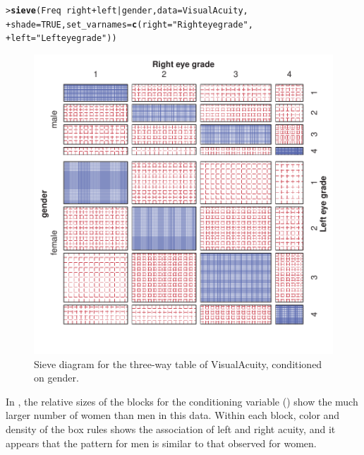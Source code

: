 \documentclass[10pt,krantz2]{krantz}\usepackage[]{graphicx}\usepackage[]{color}
\makeatletter
\newcommand{\hlnum}[1]{\textcolor[rgb]{0.686,0.059,0.569}{#1}}%
\newcommand{\hlstr}[1]{\textcolor[rgb]{0.192,0.494,0.8}{#1}}%
\newcommand{\hlopt}[1]{\textcolor[rgb]{0,0,0}{#1}}%
\newcommand{\hlstd}[1]{\textcolor[rgb]{0.345,0.345,0.345}{#1}}%
\newcommand{\hlkwc}[1]{\textcolor[rgb]{0.333,0.667,0.333}{#1}}%
\newcommand{\hlkwd}[1]{\textcolor[rgb]{0.737,0.353,0.396}{\textbf{#1}}}%
\newenvironment{kframe}{%
 \def\at@end@of@kframe{}%
 \ifinner\ifhmode%
  \def\at@end@of@kframe{\end{minipage}}%
  \begin{minipage}{\columnwidth}%
 \fi\fi%
 \def\FrameCommand##1{\hskip\@totalleftmargin \hskip-\fboxsep
 \colorbox{shadecolor}{##1}\hskip-\fboxsep
     \hskip-\linewidth \hskip-\@totalleftmargin \hskip\columnwidth}%
 \MakeFramed {\advance\hsize-\width
   \@totalleftmargin\z@ \linewidth\hsize
   \@setminipage}}%
 {\par\unskip\endMakeFramed%
 \at@end@of@kframe}
\newenvironment{knitrout}{}{} %
\renewenvironment{knitrout}{\small\renewcommand{\baselinestretch}{.85}}{} %
\makeatother
\begin{document}
\begin{knitrout}
\color{fgcolor}\begin{kframe}
\begin{alltt}
\hlstd{> }\hlkwd{sieve}\hlstd{(Freq} \hlopt{~} \hlstd{right} \hlopt{+} \hlstd{left} \hlopt{|} \hlstd{gender,} \hlkwc{data} \hlstd{= VisualAcuity,}
\hlstd{+ }      \hlkwc{shade} \hlstd{=} \hlnum{TRUE}\hlstd{,} \hlkwc{set_varnames} \hlstd{=} \hlkwd{c}\hlstd{(}\hlkwc{right} \hlstd{=} \hlstr{"Right eye grade"}\hlstd{,}
\hlstd{+ }                                     \hlkwc{left} \hlstd{=} \hlstr{"Left eye grade"}\hlstd{))}
\end{alltt}
\end{kframe}\begin{figure}[!htbp]

\centerline{\includegraphics[width=.7\textwidth]{ch04/fig/VA-sieve3-1} }

\caption[Sieve diagram for the three-way table of VisualAcuity, conditioned on gender]{Sieve diagram for the three-way table of VisualAcuity, conditioned on gender.}\label{fig:VA-sieve3}
\end{figure}


\end{knitrout}

In , the relative sizes of the blocks for the conditioning
variable () show the much larger number of women than men in
this data.  Within each block, color and density of the box rules shows the
association of left and right acuity, and it appears that the pattern
for men is similar to that observed for women.
\end{document}
